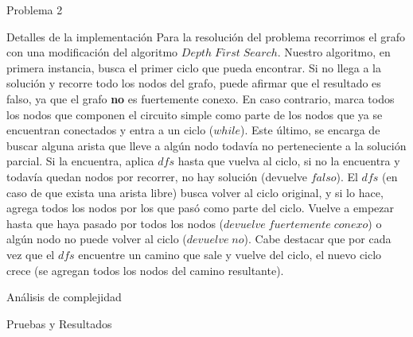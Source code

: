 \begin{section}{Problema 2}
\begin{subsection}{Detalles de la implementación}
		Para la resolución del problema recorrimos el grafo con una modificación del algoritmo $Depth\; First\; Search$. Nuestro algoritmo, en primera instancia, busca el primer ciclo que pueda encontrar. Si no llega a la solución y recorre todo los nodos del grafo, puede afirmar que el resultado es falso, ya que el grafo \textbf{no} es fuertemente conexo. En caso contrario, marca todos los nodos que componen el circuito simple como parte de los nodos que ya se encuentran conectados y entra a un ciclo ($while$). Este último, se encarga de buscar alguna arista que lleve a algún nodo todavía no perteneciente a la solución parcial. Si la encuentra, aplica $dfs$ hasta que vuelva al ciclo, si no la encuentra y todavía quedan nodos por recorrer, no hay solución (devuelve $falso$). El $dfs$ (en caso de que exista una arista libre) busca volver al ciclo original, y si lo hace, agrega todos los nodos por los que pasó como parte del ciclo. Vuelve a empezar hasta que haya pasado por todos los nodos ($devuelve\; fuertemente\; conexo$) o algún nodo no puede volver al ciclo ($devuelve\; no$). Cabe destacar que por cada vez que el $dfs$ encuentre un camino que sale y vuelve del ciclo, el nuevo ciclo crece (se agregan todos los nodos del camino resultante).
	\end{subsection}


	\begin{subsection}{Análisis de complejidad}
		
	\end{subsection}


	\begin{subsection}{Pruebas y Resultados}

	\end{subsection}

\end{section}

